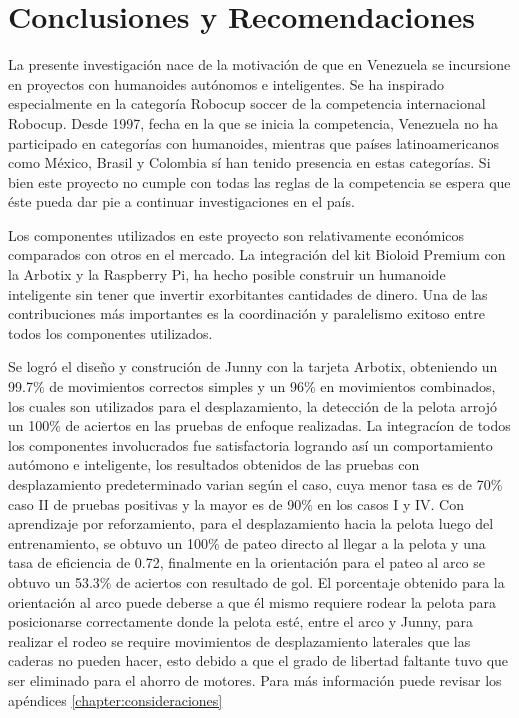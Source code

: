 \chapter{Conclusiones y Recomendaciones} \label{chapter:conclusiones}

\label{chap:conclusiones}

La presente investigación nace de la motivación de que en Venezuela se incursione en proyectos con humanoides autónomos e inteligentes. Se ha inspirado especialmente en la categoría Robocup soccer de la competencia internacional Robocup. Desde 1997, fecha en la que se inicia la competencia, Venezuela no ha participado en categorías con humanoides, mientras que países latinoamericanos como México, Brasil y Colombia sí han tenido presencia en estas categor\'ias. Si bien este proyecto no cumple con todas las reglas de la competencia se espera que éste pueda dar pie a continuar investigaciones en el pa\'is.

Los componentes utilizados en este proyecto son relativamente económicos comparados con otros en el mercado. La integración del kit Bioloid Premium con la Arbotix y la Raspberry Pi, ha hecho posible construir un humanoide inteligente sin tener que invertir exorbitantes cantidades de dinero. Una de las contribuciones más importantes es la coordinación y paralelismo exitoso entre todos los componentes utilizados.

Se logr\'o el dise\~no y construci\'on de Junny con la tarjeta Arbotix, obteniendo un 99.7\% de movimientos correctos simples y un 96\% en movimientos combinados, los cuales son utilizados para el desplazamiento, la detecci\'on de la pelota arroj\'o un 100\% de aciertos en las pruebas de enfoque realizadas. La integrac\'ion de todos los componentes involucrados fue satisfactoria logrando as\'i un comportamiento aut\'omono e inteligente, los resultados obtenidos de las pruebas con desplazamiento predeterminado varian seg\'un el caso, cuya menor tasa es de 70\% caso II de pruebas positivas y la mayor es de 90\% en los casos I y IV. Con aprendizaje por reforzamiento, para el desplazamiento hacia la pelota luego del entrenamiento, se obtuvo un 100\% de pateo directo al llegar a la pelota y una tasa de eficiencia de 0.72, finalmente en la orientaci\'on para el pateo al arco se obtuvo un 53.3\% de aciertos con resultado de gol. 
El porcentaje obtenido para la orientaci\'on al arco puede deberse a que  \'el mismo requiere rodear la pelota para posicionarse correctamente donde la pelota est\'e, entre el arco y Junny, para realizar el rodeo se require movimientos de desplazamiento laterales que las caderas no pueden hacer, esto debido a que el grado de libertad faltante tuvo que ser eliminado para el ahorro de motores. Para m\'as informaci\'on puede revisar los ap\'endices \ref{chapter:consideraciones} 

